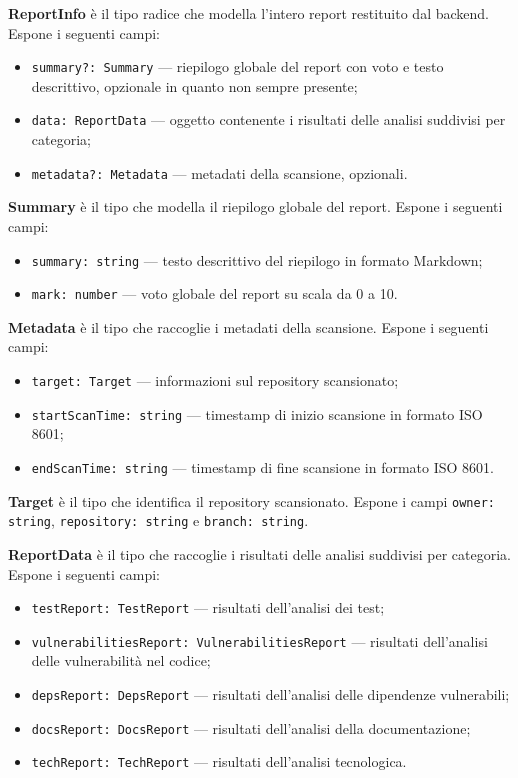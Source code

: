 \documentclass[a4paper, 11pt]{article}
\newcounter{subsubsubsection}[subsubsection]
\newcounter{subsubsubsubsection}[subsubsubsection]
\begin{document}




\textbf{ReportInfo} è il tipo radice che modella l'intero report restituito dal backend. Espone
i seguenti campi:
\begin{itemize}
  \item \texttt{summary?: Summary} — riepilogo globale del report con voto e testo descrittivo,
        opzionale in quanto non sempre presente;
  \item \texttt{data: ReportData} — oggetto contenente i risultati delle analisi suddivisi per
        categoria;
  \item \texttt{metadata?: Metadata} — metadati della scansione, opzionali.
\end{itemize}

\textbf{Summary} è il tipo che modella il riepilogo globale del report. Espone i seguenti campi:
\begin{itemize}
  \item \texttt{summary: string} — testo descrittivo del riepilogo in formato Markdown;
  \item \texttt{mark: number} — voto globale del report su scala da 0 a 10.
\end{itemize}

\textbf{Metadata} è il tipo che raccoglie i metadati della scansione. Espone i seguenti campi:
\begin{itemize}
  \item \texttt{target: Target} — informazioni sul repository scansionato;
  \item \texttt{startScanTime: string} — timestamp di inizio scansione in formato ISO 8601;
  \item \texttt{endScanTime: string} — timestamp di fine scansione in formato ISO 8601.
\end{itemize}

\textbf{Target} è il tipo che identifica il repository scansionato. Espone i campi
\texttt{owner: string}, \texttt{repository: string} e \texttt{branch: string}.

\textbf{ReportData} è il tipo che raccoglie i risultati delle analisi suddivisi per categoria.
Espone i seguenti campi:
\begin{itemize}
  \item \texttt{testReport: TestReport} — risultati dell'analisi dei test;
  \item \texttt{vulnerabilitiesReport: VulnerabilitiesReport} — risultati dell'analisi delle
        vulnerabilità nel codice;
  \item \texttt{depsReport: DepsReport} — risultati dell'analisi delle dipendenze vulnerabili;
  \item \texttt{docsReport: DocsReport} — risultati dell'analisi della documentazione;
  \item \texttt{techReport: TechReport} — risultati dell'analisi tecnologica.
\end{itemize}
\end{document}
